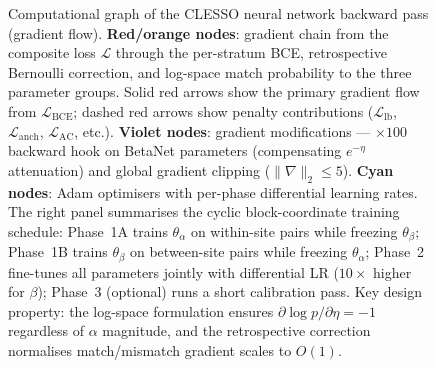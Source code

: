 \documentclass{article}
\begin{document}
\begin{figure}[p]
{\begin{tikzpicture}
\end{tikzpicture}
}%
\caption{%
Computational graph of the CLESSO neural network backward pass (gradient flow).
\textbf{Red/orange nodes}: gradient chain from the composite loss $\mathcal{L}$ through the per-stratum BCE, retrospective Bernoulli correction, and log-space match probability to the three parameter groups.
Solid red arrows show the primary gradient flow from $\mathcal{L}_{\mathrm{BCE}}$; dashed red arrows show penalty contributions ($\mathcal{L}_{\mathrm{lb}}$, $\mathcal{L}_{\mathrm{anch}}$, $\mathcal{L}_{\mathrm{AC}}$, etc.).
\textbf{Violet nodes}: gradient modifications --- $\times 100$ backward hook on BetaNet parameters (compensating $e^{-\eta}$ attenuation) and global gradient clipping ($\lVert\nabla\rVert_2 \leq 5$).
\textbf{Cyan nodes}: Adam optimisers with per-phase differential learning rates.
The right panel summarises the cyclic block-coordinate training schedule: Phase~1A trains $\theta_\alpha$ on within-site pairs while freezing $\theta_\beta$; Phase~1B trains $\theta_\beta$ on between-site pairs while freezing $\theta_\alpha$; Phase~2 fine-tunes all parameters jointly with differential LR ($10\times$ higher for $\beta$); Phase~3 (optional) runs a short calibration pass.
Key design property: the log-space formulation ensures $\partial \log p / \partial\eta = -1$ regardless of $\alpha$ magnitude, and the retrospective correction normalises match/mismatch gradient scales to $O(1)$.%
}
\label{fig:backward-pass}
\end{figure}
\end{document}
